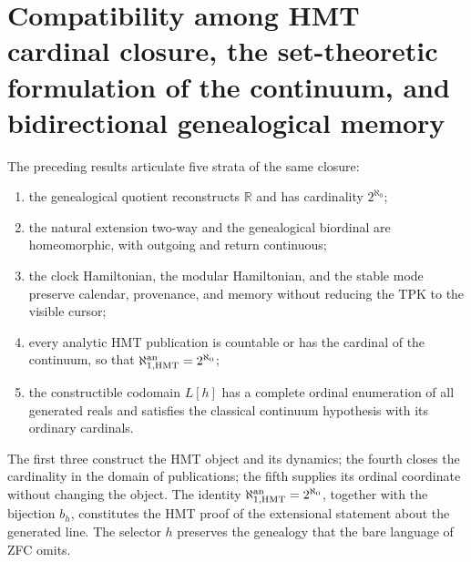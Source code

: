 \section{Compatibility among HMT cardinal closure, the set-theoretic formulation of the continuum, and bidirectional genealogical memory}

The preceding results articulate five strata of the same closure:
\begin{enumerate}
 \item the genealogical quotient reconstructs \(\mathbb R\) and has cardinality
       \(2^{\aleph_0}\);
 \item the natural extension two-way and the genealogical biordinal are
       homeomorphic, with outgoing and return continuous;
 \item the clock Hamiltonian, the modular Hamiltonian, and the stable mode
       preserve calendar, provenance, and memory without reducing the TPK to the
       visible cursor;
 \item every analytic HMT publication is countable or has the cardinal of the
       continuum, so that
       \(\aleph_{1,\mathrm{HMT}}^{\rm an}=2^{\aleph_0}\);
 \item the constructible codomain \(L[h]\) has a complete ordinal enumeration
       of all generated reals and satisfies the classical
       continuum hypothesis with its ordinary cardinals.
\end{enumerate}
The first three construct the HMT object and its dynamics; the fourth closes the
cardinality in the domain of publications; the fifth supplies its ordinal
coordinate without changing the object. The identity
\(\aleph_{1,\mathrm{HMT}}^{\rm an}=2^{\aleph_0}\), together with the bijection
\(b_h\), constitutes the HMT proof of the extensional statement about the
generated line. The selector \(h\) preserves the genealogy that the bare
language of ZFC omits.

